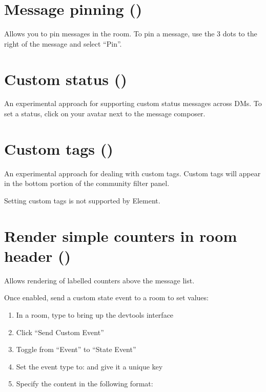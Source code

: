 \documentclass[letterpaper,10pt,openany,oneside,english]{sphinxmanual}
\begin{document}
\chapter{Message pinning ()}
\label{\detokenize{labs:message-pinning-feature-pinning}}
\sphinxAtStartPar
Allows you to pin messages in the room. To pin a message, use the 3 dots to the right of the message
and select “Pin”.


\chapter{Custom status ()}
\label{\detokenize{labs:custom-status-feature-custom-status}}
\sphinxAtStartPar
An experimental approach for supporting custom status messages across DMs. To set a status, click on
your avatar next to the message composer.


\chapter{Custom tags ()}
\label{\detokenize{labs:custom-tags-feature-custom-tags}}
\sphinxAtStartPar
An experimental approach for dealing with custom tags. Custom tags will appear in the bottom portion
of the community filter panel.

\sphinxAtStartPar
Setting custom tags is not supported by Element.


\chapter{Render simple counters in room header ()}
\label{\detokenize{labs:render-simple-counters-in-room-header-feature-state-counters}}
\sphinxAtStartPar
Allows rendering of labelled counters above the message list.

\sphinxAtStartPar
Once enabled, send a custom state event to a room to set values:
\begin{enumerate}
%
\item {} 
\sphinxAtStartPar
In a room, type  to bring up the devtools interface

\item {} 
\sphinxAtStartPar
Click “Send Custom Event”

\item {} 
\sphinxAtStartPar
Toggle from “Event” to “State Event”

\item {} 
\sphinxAtStartPar
Set the event type to:  and give it a unique key

\item {} 
\sphinxAtStartPar
Specify the content in the following format:

\end{enumerate}
\end{document}
